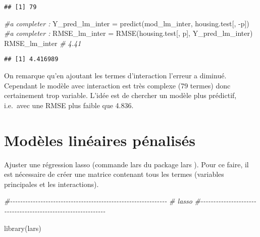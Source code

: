 \documentclass[
]{article}
\newenvironment{Shaded}{\begin{snugshade}}{\end{snugshade}}
\newcommand{\CommentTok}[1]{\textcolor[rgb]{0.56,0.35,0.01}{\textit{#1}}}
\newcommand{\FunctionTok}[1]{\textcolor[rgb]{0.00,0.00,0.00}{#1}}
\newcommand{\NormalTok}[1]{#1}
\newcommand{\OtherTok}[1]{\textcolor[rgb]{0.56,0.35,0.01}{#1}}
\newcommand{\SpecialCharTok}[1]{\textcolor[rgb]{0.00,0.00,0.00}{#1}}
\begin{document}
\begin{verbatim}
## [1] 79
\end{verbatim}

\begin{Shaded}
\begin{Highlighting}[]
\CommentTok{\#a completer :}
\NormalTok{Y\_pred\_lm\_inter }\OtherTok{=} \FunctionTok{predict}\NormalTok{(mod\_lm\_inter, housing.test[, }\SpecialCharTok{{-}}\NormalTok{p])}
\CommentTok{\#a completer :}
\NormalTok{RMSE\_lm\_inter }\OtherTok{=} \FunctionTok{RMSE}\NormalTok{(housing.test[, p], Y\_pred\_lm\_inter)}
\NormalTok{RMSE\_lm\_inter  }\CommentTok{\# 4.41}
\end{Highlighting}
\end{Shaded}

\begin{verbatim}
## [1] 4.416989
\end{verbatim}

On remarque qu'en ajoutant les termes d'interaction l'erreur a diminué.
Cependant le modèle avec interaction est très complexe (79 termes) donc
certainement trop variable. L'idée est de chercher un modèle plus
prédictif, i.e.~avec une RMSE plus faible que 4.836.

\hypertarget{moduxe8les-linuxe9aires-puxe9nalisuxe9s}{%
\section{Modèles linéaires
pénalisés}\label{moduxe8les-linuxe9aires-puxe9nalisuxe9s}}

Ajuster une régression lasso (commande lars du package lars ). Pour ce
faire, il est nécessaire de créer une matrice contenant tous les termes
(variables principales et les interactions).

\begin{Shaded}
\begin{Highlighting}[]
\CommentTok{\#{-}{-}{-}{-}{-}{-}{-}{-}{-}{-}{-}{-}{-}{-}{-}{-}{-}{-}{-}{-}{-}{-}{-}{-}{-}{-}{-}{-}{-}{-}{-}{-}{-}{-}{-}{-}{-}{-}{-}{-}{-}{-}{-}{-}{-}{-}{-}{-}{-}{-}{-}{-}{-}{-}{-}{-}{-}{-}{-}{-}{-}{-}}
\CommentTok{\# lasso}
\CommentTok{\#{-}{-}{-}{-}{-}{-}{-}{-}{-}{-}{-}{-}{-}{-}{-}{-}{-}{-}{-}{-}{-}{-}{-}{-}{-}{-}{-}{-}{-}{-}{-}{-}{-}{-}{-}{-}{-}{-}{-}{-}{-}{-}{-}{-}{-}{-}{-}{-}{-}{-}{-}{-}{-}{-}{-}{-}{-}{-}{-}{-}{-}{-}}

\FunctionTok{library}\NormalTok{(lars)}
\end{Highlighting}
\end{Shaded}
\end{document}
